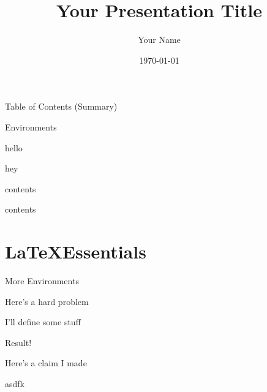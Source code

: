 \documentclass[12pt, aspectratio = 169]{beamer}
\title[Short title]{Your Presentation Title}
\author{Your Name}
\institute[UCI]{University of California, Irvine}
\date{\today}
\begin{document}

\maketitle

\begin{frame}{Table of Contents (Summary)}
\tableofcontents
\end{frame}

\begin{frame}{Environments}
    \begin{theorem}
    hello
    \end{theorem}
    \begin{lemma}
    hey
    \end{lemma}
    \begin{prop}
    contents
    \end{prop}
    \begin{cor}
    contents
    \end{cor}
\end{frame}

\section{\LaTeX Essentials}


\begin{frame}{More Environments}
	\begin{pro}
	Here's a hard problem
	\end{pro}
	\begin{defi}
	I'll define some stuff
	\end{defi}
	\begin{res}
	Result!
	\end{res}
	\begin{cl}
	Here's a claim I made
	\end{cl}
	\begin{mq}
	asdfk
	\end{mq}
\end{frame}
\end{document}
